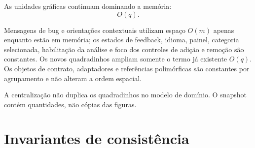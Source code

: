 \documentclass[12pt,a4paper]{article}
\begin{document}
As unidades gráficas continuam dominando a memória:
\[
O(q).
\]

Mensagens de bug e orientações contextuais utilizam espaço $O(m)$ apenas enquanto estão em memória; os estados de feedback, idioma, painel, categoria selecionada, habilitação da análise e foco dos controles de adição e remoção são constantes. Os novos quadradinhos ampliam somente o termo já existente $O(q)$. Os objetos de contrato, adaptadores e referências polimórficas são constantes por agrupamento e não alteram a ordem espacial.

A centralização não duplica os quadradinhos no modelo de domínio. O snapshot contém quantidades, não cópias das figuras.

\section{Invariantes de consistência}
\end{document}
